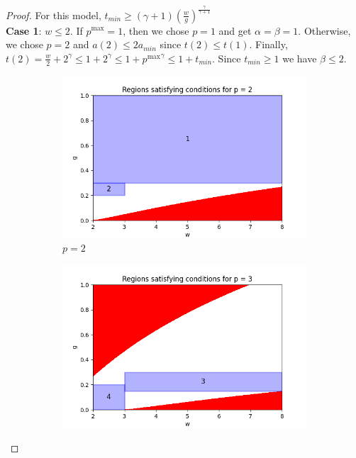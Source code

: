 \documentclass{article}
\begin{document}
\begin{proof}
For this model, $t_{min} \geq \left( \gamma+1\right)\left( \frac{w}{g} \right)^{\frac{\gamma}{\gamma+1}}$\\


\textbf{Case 1}: $w \leq 2$. 
If $p^{\max}=1$, then we chose $p=1$ and get $\alpha=\beta=1$. Otherwise, we chose $p=2$ and $a(2) \leq 2a_{min}$ since $t(2) \leq t(1)$. Finally, $t(2) = \frac{w}{2}+2^\gamma \leq 1+2^\gamma \leq 1+ {p^{\max}}^\gamma \leq 1+t_{min}$. Since $t_{min} \geq 1$ we have $\beta \leq 2$.


\begin{figure}[ht]
    \centering
    \begin{subfigure}{0.32\textwidth}
        \includegraphics[width=\linewidth]{plotsexcom/plot_p_2.png}
        \caption{$p = 2$}
    \end{subfigure}
    \hfill
    \begin{subfigure}{0.32\textwidth}
        \includegraphics[width=\linewidth]{plotsexcom/plot_p_3.png}

\end{subfigure}
\end{figure}
\end{proof}
\end{document}
